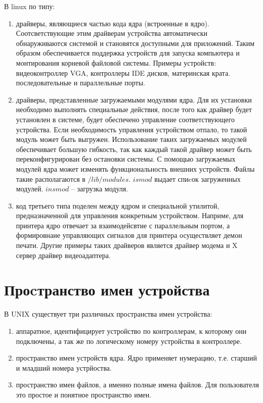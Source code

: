 В linux по типу:
\begin{enumerate}
	\item драйверы, являющиеся частью кода ядра (встроенные в ядро). Соотсветствующие этим драйверам устройства автоматически обнаруживаются системой и становятся доступными для приложений. Таким образом обеспечивается поддержка устройств для запуска компьютера и монтирования корневой файловой системы. Примеры устройств: видеоконтроллер VGA, контроллеры IDE дисков, материнская крата. последовательные и параллельные порты.
	
	\item драйверы, представленные загружаемыми модулями ядра. Для их установки необходимо выполнять специальные действия, после того как драйвер будет установлен в системе, будет обеспечено управление соответствующего устройства. Если необходимость управления устройством отпало, то такой модуль может быть выгружен. Использование таких загружаемых модулей обеспечивает большую гибкость, так как каждый такой драйвер может быть переконфигурирован без остановки системы. С помощью загружаемых модулей ядра может изменять функциональность внешних устройств. Файлы такие располагаются в $/lib/modules$. $ismod$ выдает спиcок загруженных модулей. $insmod$ – загрузка модуля.

	\item код третьего типа поделен между ядром и специальной утилитой, предназначенной для управления конкретным устройством. Наприме, для принтера ядро отвечает за взаимодейсвтие с параллельным портом, а формировнаие управляющих сигналов для принтера осуществляет демон печати. Другие примеры таких драйверов является драйвер модема и X сервер драйвер видеоадаптера.
\end{enumerate}

\section{Проcтранство имен устройства}

В UNIX существует три различных пространства имен устройства:
\begin{enumerate}
	\item аппаратное, идентифицирует устройство по контроллерам, к которому они подключены, а так же по логическому номеру устройства в контроллере.
	\item  пространство имен устройств ядра. Ядро применяет нумерацию, т.е. старший и младший номера устрйоства.
	\item пространство имен файлов, а именно полные имена файлов. Для пользователя это простое и понятное пространство имен.
\end{enumerate} 

